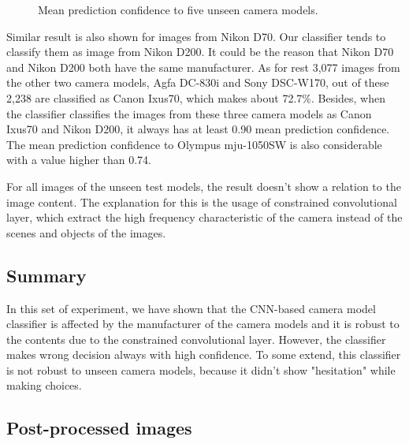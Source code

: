 \documentclass[a4paper, 9pt, twocolumn]{extarticle}
\begin{document}
\begin{figure}
	\centering
	\resizebox{!}{!}{
		{}
	}
	\caption{Mean prediction confidence to five unseen camera models.}
	\label{fig:unseen confidence}
\end{figure}

Similar result is also shown for images from Nikon D70. Our classifier tends to classify them as image from Nikon D200. It could be the reason that Nikon D70 and Nikon D200 both have the same manufacturer. As for rest 3,077 images from the other two camera models, Agfa DC-830i and Sony DSC-W170, out of these 2,238 are classified as Canon Ixus70, which makes about 72.7\%. Besides, when the classifier classifies the images from these three camera models as Canon Ixus70 and Nikon D200, it always has at least 0.90 mean prediction confidence. The mean prediction confidence to Olympus mju-1050SW is also considerable with a value higher than 0.74.

For all images of the unseen test models, the result doesn't show a relation to the image content. The explanation for this is the usage of constrained convolutional layer, which extract the high frequency characteristic of the camera instead of the scenes and objects of the images.

\subsection*{Summary}
\label{section:unseen summary}

In this set of experiment, we have shown that the CNN-based camera model classifier is affected by the manufacturer of the camera models and it is robust to the contents due to the constrained convolutional layer. However, the classifier makes wrong decision always with high confidence. To some extend, this classifier is not robust to unseen camera models, because it didn't show "hesitation" while making choices.

\subsection{Post-processed images}
\label{section:post-pro	cessed}
\end{document}
